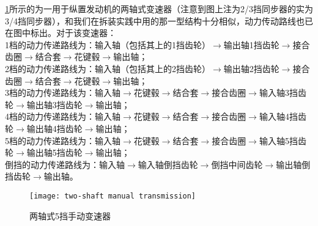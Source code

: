 \documentclass[UTF8]{ctexart}
\numberwithin{figure}{section}
\numberwithin{table}{section}
\begin{document}
\cref{two-shaft manual transmission}所示的为一用于纵置发动机的两轴式变速器（注意到图上注为2/3挡同步器的实为3/4挡同步器），和我们在拆装实践中用的那一型结构十分相似，动力传动路线也已在图中标出。对于该变速器：\\
1档的动力传递路线为：输入轴（包括其上的1挡齿轮）$\rightarrow$输出轴1挡齿轮$\rightarrow$接合齿圈$\rightarrow$结合套$\rightarrow$花键毂$\rightarrow$输出轴；\\
2档的动力传递路线为：输入轴（包括其上的2挡齿轮）$\rightarrow$输出轴2挡齿轮$\rightarrow$接合齿圈$\rightarrow$结合套$\rightarrow$花键毂$\rightarrow$输出轴；\\
3档的动力传递路线为：输入轴$\rightarrow$花键毂$\rightarrow$结合套$\rightarrow$接合齿圈$\rightarrow$输入轴3挡齿轮$\rightarrow$输出轴3挡齿轮$\rightarrow$输出轴；\\
4档的动力传递路线为：输入轴$\rightarrow$花键毂$\rightarrow$结合套$\rightarrow$接合齿圈$\rightarrow$输入轴4挡齿轮$\rightarrow$输出轴4挡齿轮$\rightarrow$输出轴；\\
5档的动力传递路线为：输入轴$\rightarrow$花键毂$\rightarrow$结合套$\rightarrow$接合齿圈$\rightarrow$输入轴5挡齿轮$\rightarrow$输出轴5挡齿轮$\rightarrow$输出轴；\\
倒挡的动力传递路线为：输入轴$\rightarrow$输入轴倒挡齿轮$\rightarrow$倒挡中间齿轮$\rightarrow$输出轴倒挡齿轮$\rightarrow$输出轴。

\begin{figure}[htbp]
	\centering
	\begin{minipage}[b]{\textwidth}
		\centering
		\texttt{[image: two-shaft manual transmission]}
		\caption{两轴式5挡手动变速器}
		\label{two-shaft manual transmission}
	\end{minipage}
\end{figure}
\end{document}
